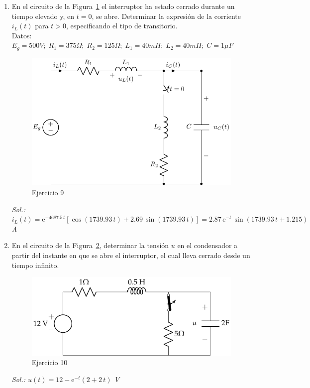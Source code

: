 \begin{enumerate}
\item En el circuito de la Figura~\ref{fig.ej12_BT4} el interruptor ha estado cerrado durante un tiempo elevado y, en $t = 0$, se abre. Determinar la expresión de la corriente $i_L(t)$ para $t>0$, especificando el tipo de transitorio.\\
Datos: $E_g = 500 V;\; R_1 = 375 \Omega;\; R_2 = 125\Omega;\; L_1 = 40 mH;\; L_2 = 40 mH;\; C = 1 \mu F$
\begin{figure}[H]
    \centering
    \includegraphics{../figs/ej12_BT4.pdf}
    \caption{Ejercicio 9}
    \label{fig.ej12_BT4}
\end{figure}

	   \emph{Sol.: $i_L(t)= \mathrm{e}^{-4687.5\,t}\left[\cos(1739.93\,t)+2.69\,\sin(1739.93\,t)\right]=2.87\,\mathrm{e}^{-t}\,\sin\left(1739.93\,t+1.215\right)$ A}
	    
\item En el circuito de la Figura~\ref{fig.ej11_BT4}, determinar la tensión $u$ en el condensador a partir del instante en que se abre el interruptor, el cual lleva cerrado desde un tiempo infinito.
\begin{figure}[H]
    \centering
    \includegraphics{../figs/ej11_BT4.pdf}
    \caption{Ejercicio 10}
    \label{fig.ej11_BT4}
\end{figure}	 
\emph{Sol.: $u(t)=12-\mathrm{e}^{-t}\left(2+2\,t\right)$ V}


\end{enumerate}
